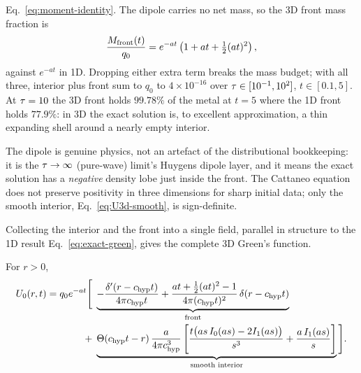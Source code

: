 \begin{remark}
Eq.~\eqref{eq:moment-identity}. The dipole carries no net mass, so the 3D
front mass fraction is
\begin{equation}
  \label{eq:front-mass-3d}
  \frac{M_{\rm front}(t)}{q_0} = e^{-at}\left(1+at+\tfrac12(at)^2\right) ,
\end{equation}
against $e^{-at}$ in 1D. Dropping either extra term breaks the mass
budget; with all three, interior plus front sum to $q_0$ to
$4\times10^{-16}$ over $\tau\in[10^{-1},10^2]$, $t\in[0.1,5]$. At
$\tau=10$ the 3D front holds $99.78\%$ of the metal at $t=5$ where
the 1D front holds $77.9\%$: in 3D the exact solution is, to excellent
approximation, a thin expanding shell around a nearly empty interior.

The dipole is genuine physics, not an artefact of the distributional
bookkeeping: it is the $\tau\to\infty$ (pure-wave) limit's Huygens
dipole layer, and it means the exact solution has a \emph{negative}
density lobe just inside the front. The Cattaneo equation does not
preserve positivity in three dimensions for sharp initial data; only the
smooth interior, Eq.~\eqref{eq:U3d-smooth}, is sign-definite.
\end{remark}

Collecting the interior and the front into a single field, parallel in
structure to the 1D result Eq.~\eqref{eq:exact-green}, gives the complete
3D Green's function.

\begin{proposition}
\label{prop:exact-3d}
For $r>0$,
\begin{equation}
  \label{eq:exact-green-3d}
  \begin{split}
    U_0(r,t) = q_0e^{-at}\Bigg[\;
      &\underbrace{-\frac{\delta'(r-c_{\rm hyp} t)}{4\pi c_{\rm hyp} t}
        +\frac{at+\tfrac12(at)^2-1}{4\pi(c_{\rm hyp} t)^2}\,\delta(r-c_{\rm hyp} t)}_{\text{front}} \\
      +\;&\underbrace{\Theta(c_{\rm hyp} t-r)\,\frac{a}{4\pi c_{\rm hyp}^3}\left[
        \frac{t\big(as\,I_0(as)-2I_1(as)\big)}{s^3}+\frac{a\,I_1(as)}{s}\right]}_{\text{smooth interior}}
    \Bigg] .
  \end{split}
\end{equation}
\end{proposition}

